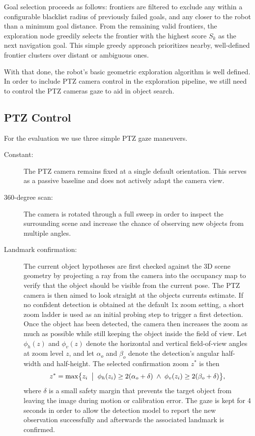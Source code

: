 \documentclass[
	parspace, %
	noindent, %
	final, %
]{elteikthesis}
\begin{document}
Goal selection proceeds as follows: frontiers are filtered to exclude any within a configurable blacklist radius of previously failed goals, and any closer to the robot than a minimum goal distance. From the remaining valid frontiers, the exploration node greedily selects the frontier with the highest score $S_k$ as the next navigation goal. This simple greedy approach prioritizes nearby, well-defined frontier clusters over distant or ambiguous ones.

With that done, the robot's basic geometric exploration algorithm is well defined. In order to include PTZ camera control in the exploration pipeline, we still need to control the PTZ cameras gaze to aid in object search. 

\subsection{PTZ Control}
For the evaluation we use three simple PTZ gaze maneuvers.

\begin{description}
    \item[Constant:] The PTZ camera remains fixed at a single default orientation. This serves as a passive baseline and does not actively adapt the camera view.

    \item[360-degree scan:] The camera is rotated through a full sweep in order to inspect the surrounding scene and increase the chance of observing new objects from multiple angles.

    \item[Landmark confirmation:] The current object hypotheses are first checked against the 3D scene geometry by projecting a ray from the camera into the occupancy map to verify that the object should be visible from the current pose. The PTZ camera is then aimed to look straight at the objects currents estimate. If no confident detection is obtained at the default 1x zoom setting, a short zoom ladder is used as an initial probing step to trigger a first detection. 
    Once the object has been detected, the camera then increases the zoom as much as possible while still keeping the object inside the field of view. Let $\phi_h(z)$ and $\phi_v(z)$ denote the horizontal and vertical field-of-view angles at zoom level $z$, and let $\alpha_o$ and $\beta_o$ denote the detection's angular half-width and half-height. The selected confirmation zoom $z^{\ast}$ is then
    \begin{align}
        z^{\ast} = \max \bigl\{ z_i \;\bigm|\; \phi_h(z_i) \ge 2(\alpha_o + \delta) \;\wedge\; \phi_v(z_i) \ge 2(\beta_o + \delta) \bigr\},
    \end{align}
    where $\delta$ is a small safety margin that prevents the target object from leaving the image during motion or calibration error. The gaze is kept for 4 seconds in order to allow the detection model to report the new observation successfully and afterwards the associated landmark is confirmed.
\end{description}
\end{document}
